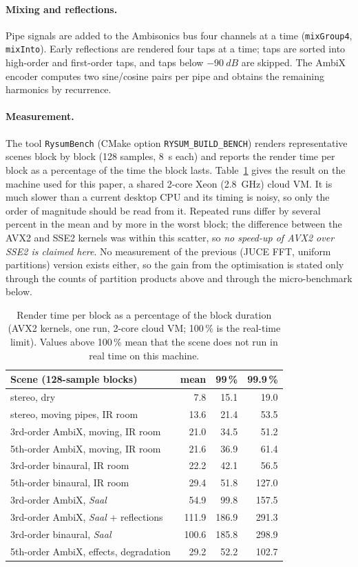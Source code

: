\documentclass[11pt,a4paper,parskip=half,DIV=11,toc=bibliography]{scrartcl}
\newcommand{\ui}[1]{\emph{#1}}                 %
\newcommand{\code}[1]{\texttt{#1}}
\newcommand{\fn}[1]{\mbox{\texttt{#1}}}
\begin{document}
\paragraph{Mixing and reflections.} Pipe signals are added to the Ambisonics bus four channels at a
time (\fn{mixGroup4}, \fn{mixInto}). Early reflections are rendered four taps at a time; taps are
sorted into high-order and first-order taps, and taps below $-\SI{90}{dB}$ are skipped. The AmbiX
encoder computes two sine/cosine pairs per pipe and obtains the remaining harmonics by recurrence.

\paragraph{Measurement.} The tool \fn{RysumBench} (CMake option \code{RYSUM\_BUILD\_BENCH}) renders
representative scenes block by block (128 samples, \SI{8}{s} each) and reports the render time per
block as a percentage of the time the block lasts. Table~\ref{tab:bench} gives the result on the
machine used for this paper, a shared 2-core Xeon (\SI{2.8}{GHz}) cloud VM. It is much slower than a
current desktop CPU and its timing is noisy, so only the order of magnitude should be read from it.
Repeated runs differ by several percent in the mean and by more in the worst block; the difference between
the AVX2 and SSE2 kernels was within this scatter, so \emph{no speed-up of AVX2 over SSE2 is claimed here}. No measurement of the previous
(JUCE FFT, uniform partitions) version exists either, so the gain from the optimisation is stated only
through the counts of partition products above and through the micro-benchmark below.
\begin{table}[t]
\centering\small
\begin{tabular}{@{}lrrr@{}}
\toprule
Scene (128-sample blocks) & mean & 99\,\% & 99.9\,\% \\
\midrule
stereo, dry                          &   7.8 &  15.1 &  19.0 \\
stereo, moving pipes, IR room        &  13.6 &  21.4 &  53.5 \\
3rd-order AmbiX, moving, IR room     &  21.0 &  34.5 &  51.2 \\
5th-order AmbiX, moving, IR room     &  21.6 &  36.9 &  61.4 \\
3rd-order binaural, IR room          &  22.2 &  42.1 &  56.5 \\
5th-order binaural, IR room          &  29.4 &  51.8 & 127.0 \\
3rd-order AmbiX, \ui{Saal}           &  54.9 &  99.8 & 157.5 \\
3rd-order AmbiX, \ui{Saal} + reflections & 111.9 & 186.9 & 291.3 \\
3rd-order binaural, \ui{Saal}        & 100.6 & 185.8 & 298.9 \\
5th-order AmbiX, effects, degradation & 29.2 &  52.2 & 102.7 \\
\bottomrule
\end{tabular}
\caption{Render time per block as a percentage of the block duration (AVX2 kernels, one run, 2-core cloud VM;
100\,\% is the real-time limit). Values above 100\,\% mean that the scene does not run in real time on this machine.}
\label{tab:bench}
\end{table}
\end{document}
